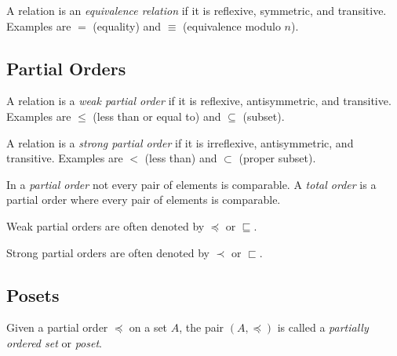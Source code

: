 \documentclass[../main.tex]{subfiles}
\begin{document}
A relation is an \textit{equivalence relation} if it is reflexive, symmetric, and transitive. Examples are $=$ (equality) and $\equiv$ (equivalence modulo $n$).

\subsection{Partial Orders}

A relation is a \textit{weak partial order} if it is reflexive, antisymmetric, and transitive. Examples are $\leq$ (less than or equal to) and $\subseteq$ (subset).

A relation is a \textit{strong partial order} if it is irreflexive, antisymmetric, and transitive. Examples are $<$ (less than) and $\subset$ (proper subset).

In a \textit{partial order} not every pair of elements is comparable. A \textit{total order} is a partial order where every pair of elements is comparable.

Weak partial orders are often denoted by $\preceq$ or $\sqsubseteq$.

Strong partial orders are often denoted by $\prec$ or $\sqsubset$.

\subsection{Posets}

Given a partial order $\preceq$ on a set $A$, the pair $(A, \preceq)$ is called a \textit{partially ordered set} or \textit{poset}.
\end{document}
